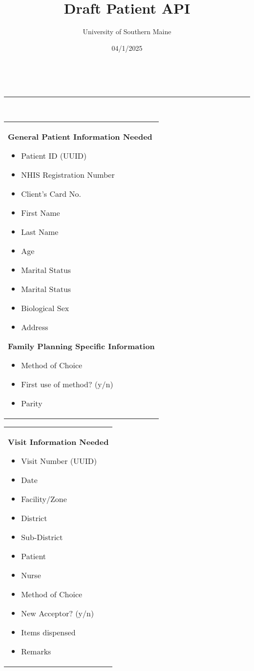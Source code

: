 \documentclass{article}
\makeatletter
\newcommand{\linia}{\rule{\linewidth}{0.5pt}}
\renewcommand{\maketitle}{
\begin{center}
\vspace{2ex}
{\huge \textsc{\@title}}
\vspace{1ex}
\\
\linia\\
\@author \hfill \@date
\vspace{4ex}
\end{center}
}
\makeatother
\begin{document}
\title{Draft Patient API}

\author{University of Southern Maine}

\date{04/1/2025}

\maketitle

\renewcommand{\arraystretch}{1.3} %

\begin{longtable}{| p{15cm} |}
    \hline
    \centering \textbf{General Patient Information Needed}
    \hline
    \begin{itemize}
        \item Patient ID (UUID)
        \item NHIS Registration Number
        \item Client's Card No.
        \item First Name
        \item Last Name
        \item Age
        \item Marital Status
        \item Marital Status
        \item Biological Sex
        \item Address
    \end{itemize} 
    \hline
    \centering \textbf{Family Planning Specific Information}
    \hline
    \begin{itemize}
        \item Method of Choice
        \item First use of method? (y/n)
        \item Parity 
    \end{itemize} 
    \hline
\end{longtable}

\pagebreak

\begin{longtable}{| p{15cm} |}
    \hline
    \centering \textbf{Visit Information Needed}
    \hline
    \begin{itemize}
        \item Visit Number (UUID)
        \item Date
        \item Facility/Zone
        \item District
        \item Sub-District
        \item Patient
        \item Nurse
        \item Method of Choice
        \item New Acceptor? (y/n)
        \item Items dispensed
        \item Remarks
    \end{itemize} 
    \hline
\end{longtable}
\end{document}
